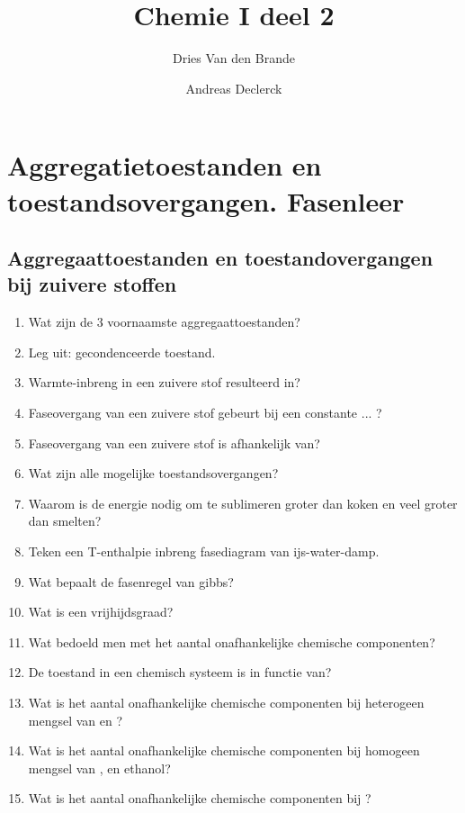 \documentclass[a4paper,12pt]{article}
\begin{document}
    \title{Chemie I deel 2}
    \author{Dries Van den Brande \and Andreas Declerck}

    \maketitle
    \section{Aggregatietoestanden en toestandsovergangen. Fasenleer}

    \subsection*{Aggregaattoestanden en toestandovergangen bij zuivere stoffen}
    \begin{enumerate}
        \item Wat zijn de 3 voornaamste aggregaattoestanden?
        \item Leg uit: gecondenceerde toestand.
        \item Warmte-inbreng in een zuivere stof resulteerd in?
        \item Faseovergang van een zuivere stof gebeurt bij een constante ... ? 
        \item Faseovergang van een zuivere stof is afhankelijk van?
        \item Wat zijn alle mogelijke toestandsovergangen?
        \item Waarom is de energie nodig om te sublimeren groter dan koken en veel groter dan smelten?
        \item Teken een T-enthalpie inbreng fasediagram van ijs-water-damp.
        \item Wat bepaalt de fasenregel van gibbs?
        \item Wat is een vrijhijdsgraad?
        \item Wat bedoeld men met het aantal onafhankelijke chemische componenten?
        \item De toestand in een chemisch systeem is in functie van?
        \item Wat is het aantal onafhankelijke chemische componenten bij heterogeen mengsel van  en ?
        \item Wat is het aantal onafhankelijke chemische componenten bij homogeen mengsel van , en ethanol?
        \item Wat is het aantal onafhankelijke chemische componenten bij ?

\end{enumerate}
\end{document}
